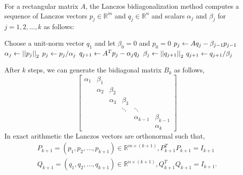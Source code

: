 For a rectangular matrix $A$, the Lanczos bidiagonalization method computes a
sequence of Lanczos vectors $p_j \in \mathbb{R}^m$ and $q_j \in \mathbb{R}^n$
and scalars $\alpha_j$ and $\beta_j$ for $j = 1, 2, \ldots, k$ as follows:

\begin{algorithm}
\begin{algorithmic}[1]
     \State Choose a unit-norm vector $q_1$ and let $\beta_0 = 0$ and $p_0 = 0$
        \State $p_j \leftarrow Aq_j - \beta_{j-1} p_{j-1}$
        \State $\alpha_j \leftarrow \left|\left|p_j\right|\right|_2$
        \State $p_j \leftarrow p_j/\alpha_j$
        \State $q_{j+1} \leftarrow A^Tp_j - \alpha_j q_j$
        \State $\beta_j \leftarrow \left|\left|q_{j+1}\right|\right|_2$
        \State $q_{j+1} \leftarrow q_{j+1}/\beta_j$
    \EndFor
\end{algorithmic}
\end{algorithm}


After $k$ steps, we can generate the bidiagonal matrix $B_k$ as follows,
\[
\begin{bmatrix}
    \alpha_1    & \beta_1   &           &           &               & \\
                & \alpha_2  & \beta_2   &           &               & \\
                &           & \alpha_3  & \beta_3   &               & \\
                &           &           & \ddots    & \ddots        & \\
                &           &           &           & \alpha_{k-1}  & \beta_{k-1} \\
                &           &           &           &               & \alpha_k
\end{bmatrix}
\]
In exact arithmetic the Lanczos vectors are orthonormal such that,
\begin{gather*}
    P_{k+1} = (p_1, p_2, \dotsc, p_{k+1}) \in \mathbb{R}^{m \times (k+1)},
        P_{k+1}^T P_{k+1} = I_{k+1} \\
    Q_{k+1} = (q_1, q_2, \dotsc, q_{k+1}) \in \mathbb{R}^{n \times  (k+1)},
        Q_{k+1}^T Q_{k+1} = I_{k+1}.
\end{gather*}

